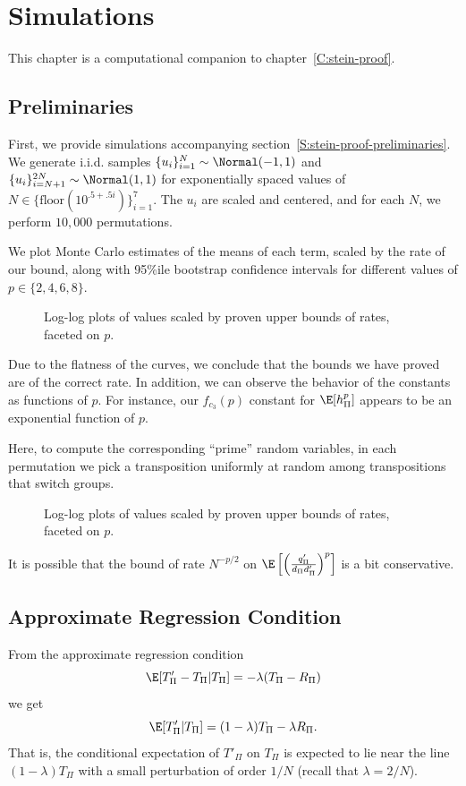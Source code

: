 \chapter{Simulations}
\label{C:simulations}
This chapter is a computational companion to chapter~\ref{C:stein-proof}.  

\section{Preliminaries}
First, we provide simulations accompanying section~\ref{S:stein-proof-preliminaries}.  We generate 
i.i.d. samples $\{u_i\}_{i=1}^{N} \sim \Normal(-1, 1)$ and $\{u_i\}_{i=N+1}^{2N} \sim \Normal(1, 1)$
for exponentially spaced values of $N \in \{\text{floor}(10^{.5+.5i})\}_{i=1}^7$.  The $u_i$ are scaled
and centered, and for each $N$, we perform $10,000$ permutations.  

We plot Monte Carlo estimates of the means of each term, scaled by the rate of our bound, along with
95\%ile bootstrap confidence intervals for different values of $p \in \{2, 4, 6, 8\}$.

\begin{figure}[!ht]
  \centering
  
  \caption{Log-log plots of values scaled by proven upper bounds of rates, faceted on $p$.}
\end{figure}
Due to the flatness of the curves, we conclude that the bounds we have proved are of the correct
rate.  In addition, we can observe the behavior of the constants as functions of $p$.  For instance,
our $f_{c_3}(p)$ constant for $\E [h_{\Pi}^p]$ appears to be an exponential function of $p$.
\clearpage

Here, to compute the corresponding ``prime'' random variables, in each permutation we pick a
transposition uniformly at random among transpositions that switch groups.

\begin{figure}[!ht]
  \centering
  
  \caption{Log-log plots of values scaled by proven upper bounds of rates, faceted on $p$.}
\end{figure}
It is possible that the bound of rate $N^{-p/2}$ on 
$\E \left [ \left ( \frac{q_{\Pi}'}{d_{\Pi}d_{\Pi}'} \right )^p \right ]$ is a bit conservative.
\clearpage

\section{Approximate Regression Condition}
From the approximate regression condition
\begin{equation*}
  \E [T'_{\Pi} - T_{\Pi} | T_{\Pi}] = -\lambda (T_{\Pi} - R_{\Pi})
\end{equation*}
we get
\begin{equation*}
  \E [T'_{\Pi}| T_{\Pi}] = (1-\lambda) T_{\Pi} - \lambda R_{\Pi}.
\end{equation*}
That is, the conditional expectation of $T'_{\Pi}$ on $T_{\Pi}$ is expected to lie near the line
$(1-\lambda) T_{\Pi}$ with a small perturbation of order $1 / N$ (recall that $\lambda = 2 / N$).

